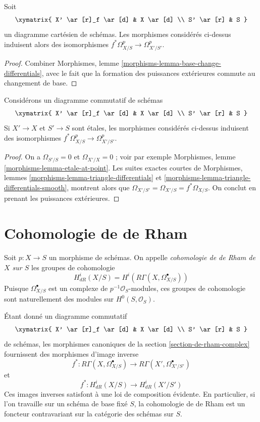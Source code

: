 \begin{lemma}
\label{lemma-base-change-de-rham}
Soit
$$
\xymatrix{
X' \ar[r]_f \ar[d] & X \ar[d] \\
S' \ar[r] & S
}
$$
un diagramme cartésien de schémas. Les morphismes considérés
ci-dessus induisent alors des isomorphismes
$f^*\Omega^p_{X/S} \to \Omega^p_{X'/S'}$.
\end{lemma}

\begin{proof}
Combiner Morphismes, lemme \ref{morphisms-lemma-base-change-differentials},
avec le fait que la formation des puissances extérieures commute au changement de base.
\end{proof}

\begin{lemma}
\label{lemma-etale}
Considérons un diagramme commutatif de schémas
$$
\xymatrix{
X' \ar[r]_f \ar[d] & X \ar[d] \\
S' \ar[r] & S
}
$$
Si $X' \to X$ et $S' \to S$ sont étales, les morphismes considérés
ci-dessus induisent des isomorphismes
$f^*\Omega^p_{X/S} \to \Omega^p_{X'/S'}$.
\end{lemma}

\begin{proof}
On a $\Omega_{S'/S} = 0$ et $\Omega_{X'/X} = 0$ ; voir par exemple
Morphismes, lemme \ref{morphisms-lemma-etale-at-point}. Les suites exactes courtes de
Morphismes, lemmes
\ref{morphisms-lemma-triangle-differentials} et
\ref{morphisms-lemma-triangle-differentials-smooth},
montrent alors que $\Omega_{X'/S'} = \Omega_{X'/S} = f^*\Omega_{X/S}$.
On conclut en prenant les puissances extérieures.
\end{proof}






\section{Cohomologie de de Rham}
\label{section-de-rham-cohomology}

\noindent
Soit $p : X \to S$ un morphisme de schémas. On appelle
{\it cohomologie de de Rham de $X$ sur $S$} les groupes de cohomologie
$$
H^i_{dR}(X/S) = H^i(R\Gamma(X, \Omega^\bullet_{X/S}))
$$
Puisque $\Omega^\bullet_{X/S}$ est un complexe de $p^{-1}\mathcal{O}_S$-modules,
ces groupes de cohomologie sont naturellement des modules sur $H^0(S, \mathcal{O}_S)$.

\medskip\noindent
Étant donné un diagramme commutatif
$$
\xymatrix{
X' \ar[r]_f \ar[d] & X \ar[d] \\
S' \ar[r] & S
}
$$
de schémas, les morphismes canoniques de la section \ref{section-de-rham-complex}
fournissent des morphismes d'image inverse
$$
f^* :
R\Gamma(X, \Omega^\bullet_{X/S})
\longrightarrow
R\Gamma(X', \Omega^\bullet_{X'/S'})
$$
et
$$
f^* : H^i_{dR}(X/S) \longrightarrow H^i_{dR}(X'/S')
$$
Ces images inverses satisfont à une loi de composition évidente.
En particulier, si l'on travaille sur un schéma de base fixé $S$, la cohomologie
de de Rham est un foncteur contravariant sur la catégorie des schémas sur $S$.

